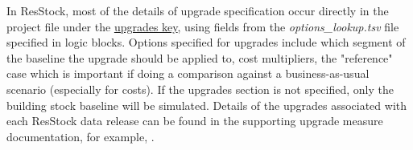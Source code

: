 In ResStock, most of the details of upgrade specification occur directly in the project file under the \href{https://buildstockbatch.readthedocs.io/en/v2023.10.0/project_defn.html#upgrade-scenarios}{upgrades key}, using fields from the \textit{options\_lookup.tsv} file specified in logic blocks. Options specified for upgrades include which segment of the baseline the upgrade should be applied to, cost multipliers, the "reference" case which is important if doing a comparison against a business-as-usual scenario (especially for costs). If the upgrades section is not specified, only the building stock baseline will be simulated. Details of the upgrades associated with each ResStock data release can be found in the supporting upgrade measure documentation, for example, \cite{Present2024}.

